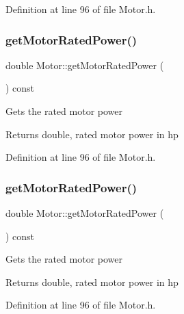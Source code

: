 Definition at line 96 of file Motor.\+h.

\mbox{\label{class_motor_a476d3790492959945b3b75d1638f737f}} 
\subsubsection{\texorpdfstring{get\+Motor\+Rated\+Power()}{getMotorRatedPower()}\hspace{0.1cm}{\footnotesize\ttfamily [2/3]}}
{\footnotesize\ttfamily double Motor\+::get\+Motor\+Rated\+Power (\begin{DoxyParamCaption}{ }\end{DoxyParamCaption}) const\hspace{0.3cm}{\ttfamily [inline]}}

Gets the rated motor power

\begin{DoxyReturn}{Returns}
double, rated motor power in hp 
\end{DoxyReturn}


Definition at line 96 of file Motor.\+h.

\mbox{\label{class_motor_a476d3790492959945b3b75d1638f737f}} 
\subsubsection{\texorpdfstring{get\+Motor\+Rated\+Power()}{getMotorRatedPower()}\hspace{0.1cm}{\footnotesize\ttfamily [3/3]}}
{\footnotesize\ttfamily double Motor\+::get\+Motor\+Rated\+Power (\begin{DoxyParamCaption}{ }\end{DoxyParamCaption}) const\hspace{0.3cm}{\ttfamily [inline]}}

Gets the rated motor power

\begin{DoxyReturn}{Returns}
double, rated motor power in hp 
\end{DoxyReturn}


Definition at line 96 of file Motor.\+h.

